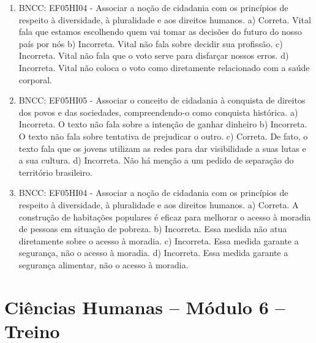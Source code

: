 \begin{enumerate}
\item
BNCC: EF05HI04 - Associar a noção de cidadania com os
princípios de respeito à diversidade, à pluralidade e aos direitos
humanos.
a) Correta. Vital fala que estamos escolhendo quem vai tomar as decisões
do futuro do nosso país por nós
b) Incorreta. Vital não fala sobre decidir sua profissão.
c) Incorreta. Vital não fala que o voto serve para disfarçar nossos
erros.
d) Incorreta. Vital não coloca o voto como diretamente relacionado com a
saúde corporal.

\item
BNCC: EF05HI05 - Associar o conceito de cidadania à conquista
de direitos dos povos e das sociedades, compreendendo-o como conquista
histórica.
a) Incorreta. O texto não fala sobre a intenção de ganhar dinheiro
b) Incorreta. O texto não fala sobre tentativa de prejudicar o outro.
c) Correta. De fato, o texto fala que os jovens utilizam as redes para
dar visibilidade a suas lutas e a sua cultura.
d) Incorreta. Não há menção a um pedido de separação do território
brasileiro.

\item
BNCC: EF05HI04 - Associar a noção de cidadania com os
princípios de respeito à diversidade, à pluralidade e aos direitos
humanos.
a) Correta. A construção de habitações populares é eficaz para melhorar
o acesso à moradia de pessoas em situação de pobreza.
b) Incorreta. Essa medida não atua diretamente sobre o acesso à moradia.
c) Incorreta. Essa medida garante a segurança, não o acesso à moradia.
d) Incorreta. Essa medida garante a segurança alimentar, não o acesso
à moradia.
\end{enumerate}

\section*{Ciências Humanas – Módulo 6 – Treino}

